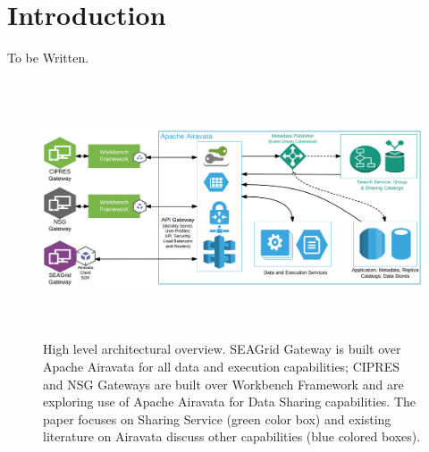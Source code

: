 \documentclass[sigconf]{acmart}
\begin{document}
\maketitle

\section{Introduction}

To be Written.

\begin{figure}
\includegraphics[height=3in, width=7in]{figures/gateway-integaration-overview.pdf}
\caption{High level architectural overview. SEAGrid Gateway is built over Apache Airavata for all data and execution capabilities; CIPRES and NSG Gateways are built over Workbench Framework and are exploring use of Apache Airavata for Data Sharing capabilities. The paper focuses on Sharing Service (green color box) and existing literature on Airavata discuss other capabilities (blue colored boxes).}
\end{figure}
\end{document}
